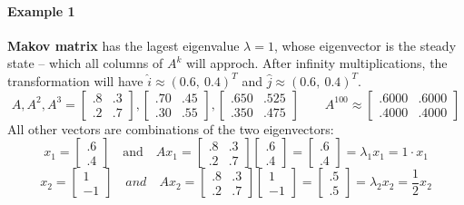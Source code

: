 \documentclass{article}
\begin{document}
\paragraph{Example 1}
\textbf{Makov matrix} has the lagest eigenvalue $ \lambda = 1 $, whose eigenvector is
the steady state -- which all columns of $ A^k $ will approch. After infinity
multiplications, the transformation will have $ \hat{i} \approx (0.6,\ 0.4)^T
$ and $ \hat{j} \approx (0.6,\ 0.4)^T $.
\[
	A, A^2, A^3
	=
	\begin{bmatrix}
		.8 & .3 \\
		.2 & .7
	\end{bmatrix}
	,
	\begin{bmatrix}
		.70 & .45 \\
		.30 & .55
	\end{bmatrix}
	,
	\begin{bmatrix}
		.650 & .525 \\
		.350 & .475
	\end{bmatrix}
	\qquad A^{100} \approx
	\begin{bmatrix}
		.6000 & .6000 \\
		.4000 & .4000
	\end{bmatrix} \]
All other vectors are combinations of the two eigenvectors:
\[ x_1 = \begin{bmatrix}
		.6 \\
		.4
	\end{bmatrix}
	\quad \text{and} \quad
	Ax_1
	=
	\begin{bmatrix}
		.8 & .3 \\
		.2 & .7
	\end{bmatrix}
	\begin{bmatrix}
		.6 \\
		.4
	\end{bmatrix}
	=
	\begin{bmatrix}
		.6 \\
		.4
	\end{bmatrix} = \lambda_1 x_1 = 1 \cdot x_1 \]
\[
	x_2
	=
	\begin{bmatrix}
		1 \\
		-1
	\end{bmatrix}
	\quad and \quad
	Ax_2
	=
	\begin{bmatrix}
		.8 & .3 \\
		.2 & .7
	\end{bmatrix}
	\begin{bmatrix}
		1 \\
		-1
	\end{bmatrix} = \begin{bmatrix}
		.5 \\
		.5
	\end{bmatrix} = \lambda_2 x_2 = \frac{1}{2} x_2
\]
\end{document}
